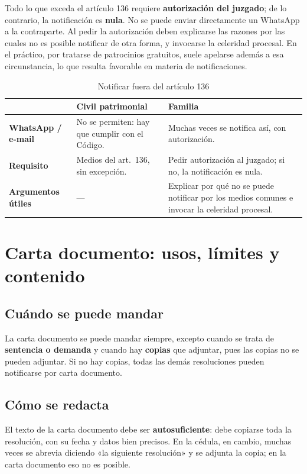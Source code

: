 \documentclass[12pt,oneside]{book}
\begin{document}
Todo lo que exceda el artículo 136 requiere \textbf{autorización del juzgado}; de lo contrario, la notificación es \textbf{nula}. No se puede enviar directamente un WhatsApp a la contraparte. Al pedir la autorización deben explicarse las razones por las cuales no es posible notificar de otra forma, y invocarse la celeridad procesal. En el práctico, por tratarse de patrocinios gratuitos, suele apelarse además a esa circunstancia, lo que resulta favorable en materia de notificaciones.

\begin{table}[H]
\centering
\caption{Notificar fuera del artículo 136}
\begin{tabularx}{\textwidth}{L{0.22\textwidth} Y Y}
\toprule
 & \textbf{Civil patrimonial} & \textbf{Familia} \\
\midrule
\textbf{WhatsApp / e-mail} & No se permiten: hay que cumplir con el Código. & Muchas veces se notifica así, con autorización. \\
\addlinespace
\textbf{Requisito} & Medios del art.\ 136, sin excepción. & Pedir autorización al juzgado; si no, la notificación es nula. \\
\addlinespace
\textbf{Argumentos útiles} & --- & Explicar por qué no se puede notificar por los medios comunes e invocar la celeridad procesal. \\
\bottomrule
\end{tabularx}
\end{table}

\section{Carta documento: usos, límites y contenido}

\subsection{Cuándo se puede mandar}

La carta documento se puede mandar siempre, excepto cuando se trata de \textbf{sentencia o demanda} y cuando hay \textbf{copias} que adjuntar, pues las copias no se pueden adjuntar. Si no hay copias, todas las demás resoluciones pueden notificarse por carta documento.

\subsection{Cómo se redacta}

El texto de la carta documento debe ser \textbf{autosuficiente}: debe copiarse toda la resolución, con su fecha y datos bien precisos. En la cédula, en cambio, muchas veces se abrevia diciendo «la siguiente resolución» y se adjunta la copia; en la carta documento eso no es posible.
\end{document}
